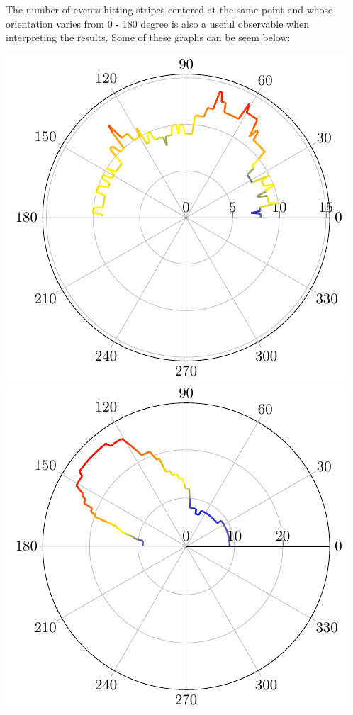 \documentclass[12pt]{article}
\begin{document}
The number of events hitting stripes centered at the same point and
whose orientation varies from 0 - 180 degree is also a useful observable
when interpreting the results. Some of these graphs can be seem below:

\includegraphics[scale=0.8]{multiplicity.pdf}  
\includegraphics[scale=0.8]{multiplicity-sim.pdf} 
\end{document}
